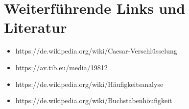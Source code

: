 \documentclass[12pt, letterpaper]{article}
\begin{document}
\section{Weiterführende Links und Literatur}

\begin{itemize}
	\item https://de.wikipedia.org/wiki/Caesar-Verschlüsselung
    \item https://av.tib.eu/media/19812
    \item https://de.wikipedia.org/wiki/Häufigkeitsanalyse
    \item https://de.wikipedia.org/wiki/Buchstabenhöufigkeit
\end{itemize}
\end{document}
